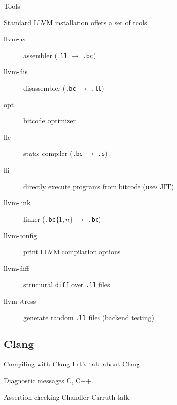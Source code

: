 \documentclass[8pt]{beamer}
\begin{document}
\begin{frame}[fragile]{Tools}
  \begin{block}{Standard LLVM installation offers a set of tools}
    \begin{description}
      \item[llvm-as] assembler (\verb+.ll+ $\rightarrow$ \verb+.bc+)
      \item[llvm-dis] disassembler (\verb+.bc+ $\rightarrow$ \verb+.ll+)
      \item[opt] bitcode optimizer
      \item[llc] static compiler (\verb+.bc+ $\rightarrow$ \verb+.s+)
      \item[lli] directly execute programs from bitcode (uses JIT)
      \item[llvm-link] linker (\verb+.bc+$\{1,n\}$ $\rightarrow$ \verb+.bc+)
      \item[llvm-config] print LLVM compilation options
      \item[llvm-diff] structural \verb+diff+ over \verb+.ll+ files
      \item[llvm-stress] generate random \verb+.ll+ files (backend testing)
    \end{description}
  \end{block}
\end{frame}

\subsection{Clang}

\begin{frame}{Compiling with Clang}
  Let's talk about Clang.
\end{frame}

\begin{frame}{Diagnostic messages}
  C, C++.
\end{frame}

\begin{frame}{Assertion checking}
  Chandler Carruth talk.
\end{frame}
\end{document}
